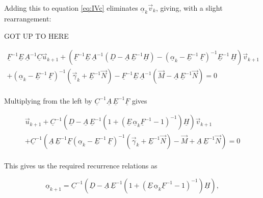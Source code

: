 \documentclass[11pt]{amsart}
\begin{document}
Adding this to equation \ref{eq:IVc} eliminates $\underline{\alpha}_{k} \vec{v}_{k}$, giving, with a slight rearrangement:

GOT UP TO HERE

\begin{multline} \label{eq:IVf}
 \underline{F}^{-1} \underline{E} \, \underline{A}^{-1} \underline{C} \vec{u}_{k+1}  + \left(  \underline{F}^{-1} \underline{E} \, \underline{A}^{-1} \left( \underline{D} - \underline{A} \, \underline{E}^{-1} \underline{H} \right)    -  \left(   \underline{\alpha}_{k}  -  \underline{E}^{-1} \, \underline{F}  \right)^{-1} \underline{E}^{-1} \, \underline{H}    \right) \vec{v}_{k+1}  \\
 +   \left(   \underline{\alpha}_{k}  -  \underline{E}^{-1} \, \underline{F}  \right)^{-1}  \left(\vec{\gamma}_{k}  +  \underline{E}^{-1} \vec{N} \right)   -  \underline{F}^{-1} \underline{E} \, \underline{A}^{-1}  \left(\vec{M}  -  \underline{A} \, \underline{E}^{-1} \vec{N}  \right)  =  0
\end{multline}
\\

Multiplying from the left by $\underline{C}^{-1} \underline{A} \, \underline{E}^{-1} \underline{F}$ gives

\begin{multline} \label{eq:IVg}
\vec{u}_{k+1}  + \underline{C}^{-1}  \left(  \underline{D}   -  \underline{A} \, \underline{E}^{-1}  \left(  1 + \left( \underline{E} \, \underline{\alpha}_{k} \underline{F}^{-1}  - 1 \right)^{-1} \right) \underline{H}    \right) \vec{v}_{k+1}  \\
 +   \underline{C}^{-1}  \left(  \underline{A} \, \underline{E}^{-1} \underline{F} \left(   \underline{\alpha}_{k}  -  \underline{E}^{-1} \, \underline{F}  \right)^{-1}  \left(\vec{\gamma}_{k}  +  \underline{E}^{-1} \vec{N} \right)   -  \vec{M}  +  \underline{A} \, \underline{E}^{-1} \vec{N}  \right)  =  0
\end{multline}
\\


This gives us the required recurrence relations as

\begin{equation} \label{eq:IValpha}
\underline{\alpha}_{k+1}  =  \underline{C}^{-1}  \left(  \underline{D}   -  \underline{A} \, \underline{E}^{-1}  \left(  1 + \left( \underline{E} \, \underline{\alpha}_{k} \underline{F}^{-1}  - 1 \right)^{-1} \right) \underline{H}    \right) ,
\end{equation} 
\end{document}
